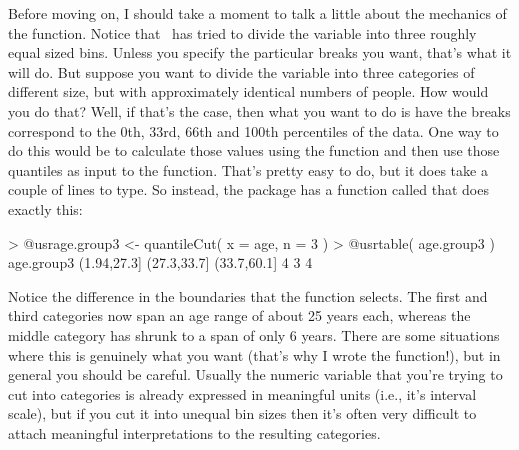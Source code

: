 Before moving on, I should take a moment to talk a little about the mechanics of the  function. Notice that \R\ has tried to divide the  variable into three roughly equal sized bins. Unless you specify the particular breaks you want, that's what it will do. But suppose you want to divide the  variable into three categories of different size, but with approximately identical numbers of people. How would you do that? Well, if that's the case, then what you want to do is have the breaks correspond to the 0th, 33rd, 66th and 100th percentiles of the data. One way to do this would be to calculate those values using the  function and then use those quantiles as input to the  function. That's pretty easy to do, but it does take a couple of lines to type. So instead, the  package has a function called  that does exactly this:
\begin{rblock1}
> @usr{age.group3 <- quantileCut( x = age, n = 3 )}
> @usr{table( age.group3 )}
age.group3
(1.94,27.3] (27.3,33.7] (33.7,60.1] 
          4           3           4 
\end{rblock1}
Notice the difference in the boundaries that the  function selects. The first and third categories now span an age range of about 25 years each, whereas the middle category has shrunk to a span of only 6 years. There are some situations where this is genuinely what you want (that's why I wrote the function!), but in general you should be careful. Usually the numeric variable that you're trying to cut into categories is already expressed in meaningful units (i.e., it's interval scale), but if you cut it into unequal bin sizes then it's often very difficult to attach meaningful interpretations to the resulting categories. 

